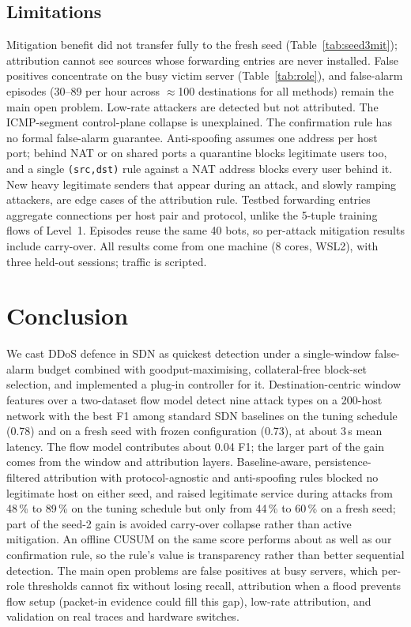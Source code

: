 \documentclass[conference]{IEEEtran}
\begin{document}
\subsection{Limitations}\label{sec:limits}
Mitigation benefit did not transfer fully to the fresh seed (Table~\ref{tab:seed3mit}); attribution cannot see sources whose forwarding entries are never installed. False positives concentrate on the busy victim server (Table~\ref{tab:role}), and false-alarm episodes (30--89 per hour across $\approx$100 destinations for all methods) remain the main open problem. Low-rate attackers are detected but not attributed. The ICMP-segment control-plane collapse is unexplained. The confirmation rule has no formal false-alarm guarantee. Anti-spoofing assumes one address per host port; behind NAT or on shared ports a quarantine blocks legitimate users too, and a single \texttt{(src,dst)} rule against a NAT address blocks every user behind it. New heavy legitimate senders that appear during an attack, and slowly ramping attackers, are edge cases of the attribution rule. Testbed forwarding entries aggregate connections per host pair and protocol, unlike the 5-tuple training flows of Level~1. Episodes reuse the same 40 bots, so per-attack mitigation results include carry-over. All results come from one machine (8 cores, WSL2), with three held-out sessions; traffic is scripted.

\section{Conclusion}
We cast DDoS defence in SDN as quickest detection under a single-window false-alarm budget combined with goodput-maximising, collateral-free block-set selection, and implemented a plug-in controller for it. Destination-centric window features over a two-dataset flow model detect nine attack types on a 200-host network with the best F1 among standard SDN baselines on the tuning schedule (0.78) and on a fresh seed with frozen configuration (0.73), at about 3\,s mean latency. The flow model contributes about 0.04 F1; the larger part of the gain comes from the window and attribution layers. Baseline-aware, persistence-filtered attribution with protocol-agnostic and anti-spoofing rules blocked no legitimate host on either seed, and raised legitimate service during attacks from 48\,\% to 89\,\% on the tuning schedule but only from 44\,\% to 60\,\% on a fresh seed; part of the seed-2 gain is avoided carry-over collapse rather than active mitigation. An offline CUSUM on the same score performs about as well as our confirmation rule, so the rule's value is transparency rather than better sequential detection. The main open problems are false positives at busy servers, which per-role thresholds cannot fix without losing recall, attribution when a flood prevents flow setup (packet-in evidence could fill this gap), low-rate attribution, and validation on real traces and hardware switches.
\end{document}

